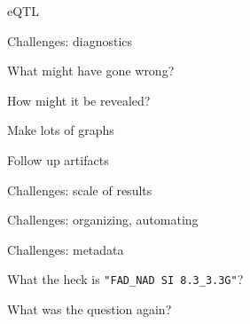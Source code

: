 \documentclass[12pt,t]{beamer}
\begin{document}
\begin{frame}[c]{eQTL}
\end{frame}





\begin{frame}[c]{Challenges: {\color{foreground} diagnostics}}

\vspace{-20mm}

  \bbi
\item What might have gone wrong?
\item How might it be revealed?
\item Make lots of graphs
\item Follow up artifacts
  \ei

\end{frame}




\begin{frame}[c]{Challenges: {\color{foreground} scale of results}}


\end{frame}




\begin{frame}[c]{Challenges: {\color{foreground} organizing, automating}}


\end{frame}


\begin{frame}[c]{Challenges: {\color{foreground} metadata}}


  \centerline{What the heck is {\hilit \tt "FAD\_NAD SI 8.3\_3.3G"}?}

\end{frame}



\begin{frame}[c]{}
\centerline{\Large What was the question again?}
\end{frame}
\end{document}
